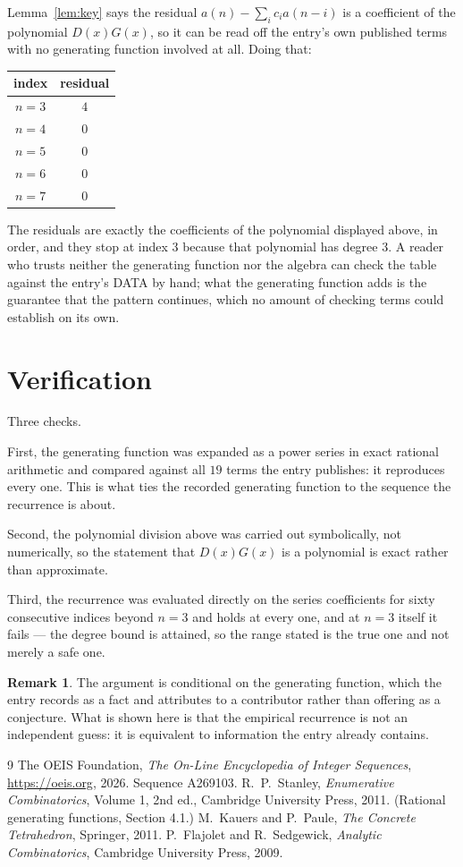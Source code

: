 \documentclass[11pt,a4paper]{article}
\theoremstyle{plain}
\theoremstyle{definition}
\newtheorem{remark}[theorem]{Remark}
\begin{document}
Lemma~\ref{lem:key} says the residual $a(n)-\sum_ic_ia(n-i)$ is a coefficient of the
polynomial $D(x)G(x)$, so it can be read off the entry's own published terms with no
generating function involved at all. Doing that:
\begin{center}
\begin{tabular}{cc}
index & residual \\ \hline
$n=3$ & $4$ \\
$n=4$ & $0$ \\
$n=5$ & $0$ \\
$n=6$ & $0$ \\
$n=7$ & $0$
\end{tabular}
\end{center}
The residuals are exactly the coefficients of the polynomial displayed above, in order, and
they stop at index $3$ because that polynomial has degree $3$. A reader who trusts
neither the generating function nor the algebra can check the table against the entry's DATA
by hand; what the generating function adds is the guarantee that the pattern continues, which
no amount of checking terms could establish on its own.

\section{Verification}

Three checks.

First, the generating function was expanded as a power series in exact rational arithmetic and
compared against all $19$ terms the entry publishes: it reproduces every one. This is
what ties the recorded generating function to the sequence the recurrence is about.

Second, the polynomial division above was carried out symbolically, not numerically, so the
statement that $D(x)G(x)$ is a polynomial is exact rather than approximate.

Third, the recurrence was evaluated directly on the series coefficients for sixty consecutive
indices beyond $n=3$ and holds at every one, and at $n=3$ itself it fails --- the
degree bound is attained, so the range stated is the true one and not merely a safe one.

\begin{remark}
The argument is conditional on the generating function, which the entry records as a fact and
attributes to a contributor rather than offering as a conjecture. What is shown here is that
the empirical recurrence is not an independent guess: it is equivalent to information the
entry already contains.
\end{remark}

\begin{thebibliography}{9}
 The OEIS Foundation, \emph{The On-Line Encyclopedia of Integer
Sequences}, \url{https://oeis.org}, 2026. Sequence A269103.
 R.~P.~Stanley, \emph{Enumerative Combinatorics}, Volume 1, 2nd ed.,
Cambridge University Press, 2011. (Rational generating functions, Section 4.1.)
 M.~Kauers and P.~Paule, \emph{The Concrete Tetrahedron}, Springer, 2011.
 P.~Flajolet and R.~Sedgewick, \emph{Analytic Combinatorics}, Cambridge
University Press, 2009.
\end{thebibliography}
\end{document}
